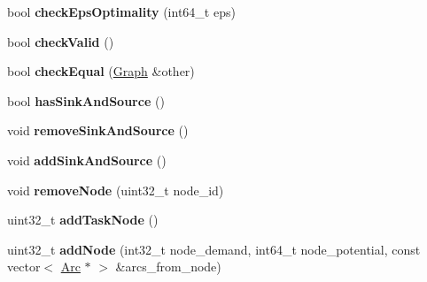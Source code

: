 \begin{DoxyCompactItemize}
\item 
\hypertarget{classflowlessly_1_1Graph_a3ad531de1b848126c46bbf986b6c2f2b}{bool {\bfseries check\-Eps\-Optimality} (int64\-\_\-t eps)}\label{classflowlessly_1_1Graph_a3ad531de1b848126c46bbf986b6c2f2b}

\item 
\hypertarget{classflowlessly_1_1Graph_ad07412381c17777348eabf31801d7877}{bool {\bfseries check\-Valid} ()}\label{classflowlessly_1_1Graph_ad07412381c17777348eabf31801d7877}

\item 
\hypertarget{classflowlessly_1_1Graph_ad23662b6dc5949274015b2b351208a4f}{bool {\bfseries check\-Equal} (\hyperlink{classflowlessly_1_1Graph}{\-Graph} \&other)}\label{classflowlessly_1_1Graph_ad23662b6dc5949274015b2b351208a4f}

\item 
\hypertarget{classflowlessly_1_1Graph_add8d90cc2601bdab3e623c548d77a84d}{bool {\bfseries has\-Sink\-And\-Source} ()}\label{classflowlessly_1_1Graph_add8d90cc2601bdab3e623c548d77a84d}

\item 
\hypertarget{classflowlessly_1_1Graph_a600730665eb12b9742c8df49bba8f4a4}{void {\bfseries remove\-Sink\-And\-Source} ()}\label{classflowlessly_1_1Graph_a600730665eb12b9742c8df49bba8f4a4}

\item 
\hypertarget{classflowlessly_1_1Graph_a0517023e386c32739f2a473f302ee333}{void {\bfseries add\-Sink\-And\-Source} ()}\label{classflowlessly_1_1Graph_a0517023e386c32739f2a473f302ee333}

\item 
\hypertarget{classflowlessly_1_1Graph_a6d694b81e253af711a36419880255521}{void {\bfseries remove\-Node} (uint32\-\_\-t node\-\_\-id)}\label{classflowlessly_1_1Graph_a6d694b81e253af711a36419880255521}

\item 
\hypertarget{classflowlessly_1_1Graph_ae0188e508ea5ecf9b11600f75b1db8b6}{uint32\-\_\-t {\bfseries add\-Task\-Node} ()}\label{classflowlessly_1_1Graph_ae0188e508ea5ecf9b11600f75b1db8b6}

\item 
\hypertarget{classflowlessly_1_1Graph_ab8c5af13f9568692a8ab000371ff91c9}{uint32\-\_\-t {\bfseries add\-Node} (int32\-\_\-t node\-\_\-demand, int64\-\_\-t node\-\_\-potential, const vector$<$ \hyperlink{classflowlessly_1_1Arc}{\-Arc} $\ast$ $>$ \&arcs\-\_\-from\-\_\-node)}\label{classflowlessly_1_1Graph_ab8c5af13f9568692a8ab000371ff91c9}


\end{DoxyCompactItemize}
